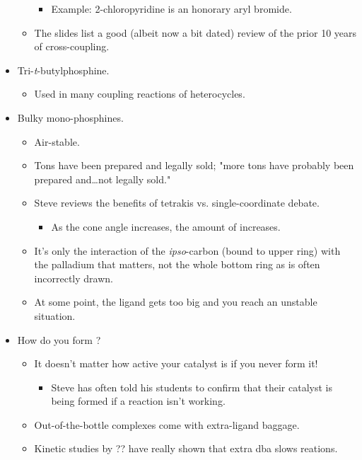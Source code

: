 \documentclass[../notes.tex]{subfiles}
\begin{document}
\begin{itemize}
\begin{itemize}
\begin{itemize}
            \item Example: 2-chloropyridine is an honorary aryl bromide.
        \end{itemize}
        \item The slides list a good (albeit now a bit dated) review of the prior 10 years of cross-coupling.
    \end{itemize}
    \item Tri-\emph{t}-butylphosphine.
    \begin{itemize}
        \item Used in many coupling reactions of heterocycles.
    \end{itemize}
    \item Bulky mono-phosphines.
    \begin{itemize}
        \item Air-stable.
        \item Tons have been prepared and legally sold; "more tons have probably been prepared and\dots not legally sold."
        \item Steve reviews the benefits of tetrakis vs. single-coordinate debate.
        \begin{itemize}
            \item As the cone angle increases, the amount of  increases.
        \end{itemize}
        \item It's only the interaction of the \emph{ipso}-carbon (bound to upper ring) with the palladium that matters, not the whole bottom ring as is often incorrectly drawn.
        \item At some point, the ligand gets too big and you reach an unstable situation.
    \end{itemize}
    \item How do you form ?
    \begin{itemize}
        \item It doesn't matter how active your catalyst is if you never form it!
        \begin{itemize}
            \item Steve has often told his students to confirm that their catalyst is being formed if a reaction isn't working.
        \end{itemize}
        \item Out-of-the-bottle  complexes come with extra-ligand baggage.
        \item Kinetic studies by ?? have really shown that extra dba slows reations.

\end{itemize}
\end{itemize}
\end{document}
